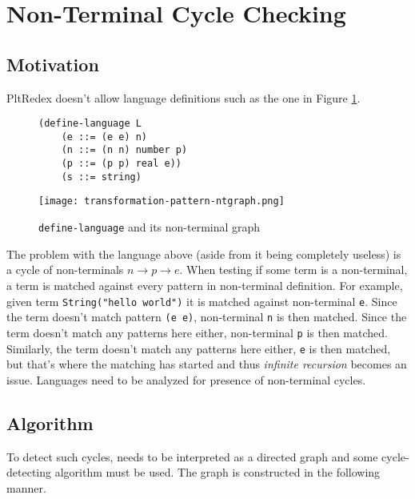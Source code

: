 \section{Non-Terminal Cycle Checking}

\subsection{Motivation}
PltRedex doesn't allow language definitions such as the one in Figure \ref{dl-ntcyclegraph}.

\begin{figure}[H]
\begin{minipage}{0.45\linewidth}
	\centering
\begin{verbatim}
(define-language L
	(e ::= (e e) n)
	(n ::= (n n) number p)
	(p ::= (p p) real e))
	(s ::= string)
\end{verbatim}
\end{minipage}
\begin{minipage}{0.45\linewidth}
	\centering
	\texttt{[image: transformation-pattern-ntgraph.png]}
\end{minipage}
	\caption{\texttt{define-language} and its non-terminal graph}
	\label{dl-ntcyclegraph}
\end{figure}

The problem with the language above (aside from it being completely useless) is a cycle of non-terminals $n \rightarrow p \rightarrow e$. When testing if some term is a non-terminal, a term is matched against every pattern in non-terminal definition. For example, given term \texttt{String("hello world")} it is matched against non-terminal \texttt{e}. Since  the term doesn't match pattern \texttt{(e e)}, non-terminal \texttt{n} is then matched. Since the term doesn't match any patterns here either, non-terminal \texttt{p} is then matched. Similarly, the term doesn't match any patterns here either, \texttt{e} is then matched, but that's where the matching has started and thus \textit{infinite recursion} becomes an issue. Languages need to be analyzed for presence of non-terminal cycles.

\subsection{Algorithm}
To detect such cycles, \DefineLanguageNoArg needs to be interpreted as a directed graph and some cycle-detecting algorithm must be used. The graph is constructed in the following manner.

